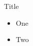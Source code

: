 \documentclass{beamer}
\begin{document}
\begin{frame}{Title}\begin{itemize}\item One \item Two\end{itemize}\end{frame}
\end{document}
